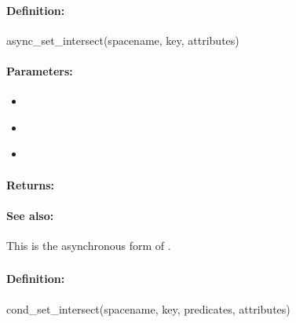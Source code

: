 \paragraph{Definition:}
\begin{rubycode}
async_set_intersect(spacename, key, attributes)
\end{rubycode}

\paragraph{Parameters:}
\begin{itemize}[noitemsep]
\item {}\\

\item {}\\

\item {}\\

\end{itemize}

\paragraph{Returns:}


\paragraph{See also:}  This is the asynchronous form of .

\pagebreak
\subsubsection{}
\label{api:ruby:cond_set_intersect}


\paragraph{Definition:}
\begin{rubycode}
cond_set_intersect(spacename, key, predicates, attributes)
\end{rubycode}


